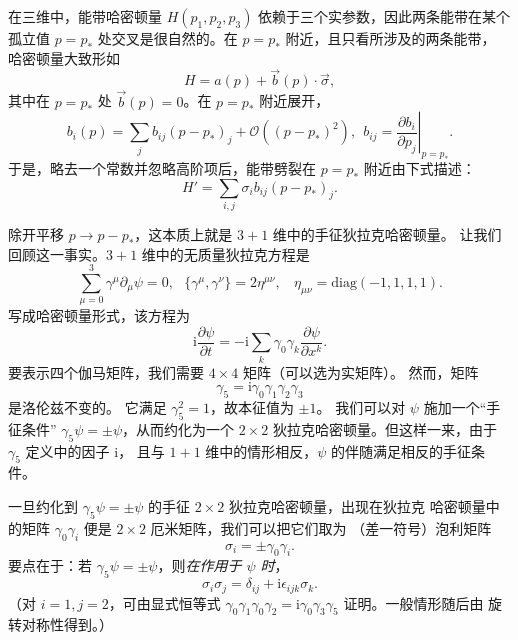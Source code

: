 \documentclass[11pt,a4paper]{article}
\numberwithin{equation}{section}
\def\g{\gamma}
\def\i{\mathrm i}
\def\be{\begin{equation}}
\def\ee{\end{equation}}
\def\O{\mathcal O}
\begin{document}
在三维中，能带哈密顿量 $H(p_1,p_2,p_3)$ 依赖于三个实参数，因此两条能带在某个
孤立值 $p=p_*$ 处交叉是很自然的。在 $p=p_*$ 附近，且只看所涉及的两条能带，
哈密顿量大致形如
\be\label{localexp}H=a( p)+ \vec b( p)\cdot \vec\sigma,\ee
其中在 $p=p_*$ 处 $\vec b(p)=0$。在 $p=p_*$ 附近展开，
\be\label{expa}b_i(p)=\sum_j b_{ij} (p-p_*)_j+\O((p-p_*)^2),~~ b_{ij}= \left.\frac{\partial b_i}{\partial p_j}\right|_{p=p_*}.\ee
于是，略去一个常数并忽略高阶项后，能带劈裂在 $p=p_*$ 附近由下式描述：
\be\label{xpa}H'=\sum_{i,j}\sigma_i b_{ij}(p-p_*)_j.\ee


除开平移 $p\to p-p_*$，这本质上就是 $3+1$ 维中的手征狄拉克哈密顿量。
让我们回顾这一事实。$3+1$ 维中的无质量狄拉克方程是
\be\label{thred}\sum_{\mu=0}^3\gamma^\mu\partial_\mu\psi=0,~~~ \{\gamma^\mu,\gamma^\nu\}=2\eta^{\mu\nu},~~~~\eta_{\mu\nu}=\mathrm{diag}(-1,1,1,1).\ee
写成哈密顿量形式，该方程为
\be\label{hameq}\i\frac{\partial\psi}{\partial t}=-\i\sum_k\gamma_0\gamma_k \frac{\partial\psi}{\partial x^k}.  \ee
要表示四个伽马矩阵，我们需要 $4\times 4$ 矩阵（可以选为实矩阵）。
然而，矩阵
\be\label{chirm}\gamma_5=\i\gamma_0\gamma_1\gamma_2\gamma_3\ee 是洛伦兹不变的。
它满足 $\gamma_5^2=1$，故本征值为 $\pm 1$。
我们可以对 $\psi$ 施加一个“手征条件” $\gamma_5\psi=\pm \psi$，从而约化为一个
$2\times 2$ 狄拉克哈密顿量。但这样一来，由于 $\gamma_5$ 定义中的因子 $\i$，
且与 $1+1$ 维中的情形相反，$\psi$ 的伴随满足相反的手征条件。

一旦约化到 $\gamma_5\psi=\pm\psi$ 的手征 $2\times 2$ 狄拉克哈密顿量，出现在狄拉克
哈密顿量中的矩阵 $\gamma_0\gamma_i$ 便是 $2\times 2$ 厄米矩阵，我们可以把它们取为
（差一符号）泡利矩阵
\be\label{sigmam}\sigma_i=\pm \gamma_0\gamma_i.\ee
要点在于：若 $\gamma_5\psi=\pm \psi$，则{\it 在作用于 $\psi$ 时}，
\be\label{news}\sigma_i\sigma_j=\delta_{ij}+\i\epsilon_{ijk}\sigma_k.\ee
（对 $i=1,j=2$，可由显式恒等式
$\gamma_0\gamma_1\gamma_0\gamma_2=\i\gamma_0\gamma_3\gamma_5$ 证明。一般情形随后由
旋转对称性得到。）
\end{document}
